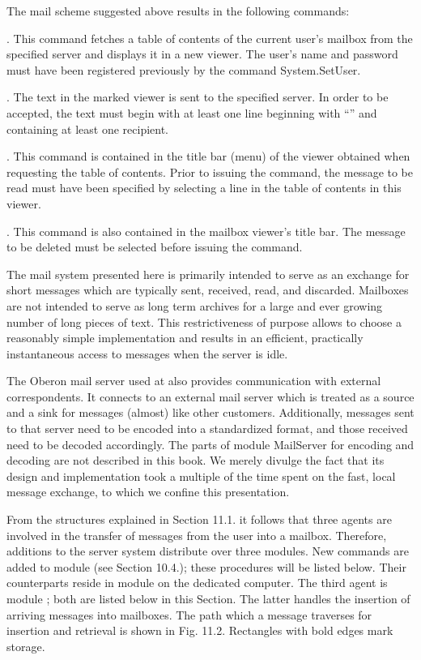 The mail scheme suggested above results in the following commands:

. This command fetches a table of contents of the current user's mailbox from the specified server and displays it in a new viewer. The user's name and password must have been registered previously by the command System.SetUser.

. The text in the marked viewer is sent to the specified server. In order to be accepted, the text must begin with at least one line beginning with ``'' and containing at least one recipient.

. This command is contained in the title bar (menu) of the viewer obtained when requesting the table of contents. Prior to issuing the command, the message to be read must have been specified by selecting a line in the table of contents in this viewer.

. This command is also contained in the mailbox viewer's title bar. The message to be deleted must be selected before issuing the command.

The mail system presented here is primarily intended to serve as an exchange for short messages which are typically sent, received, read, and discarded. Mailboxes are not intended to serve as long term archives for a large and ever growing number of long pieces of text. This restrictiveness of purpose allows to choose a reasonably simple implementation and results in an efficient, practically instantaneous access to messages when the server is idle.

The Oberon mail server used at  also provides communication with external correspondents. It connects to an external mail server which is treated as a source and a sink for messages (almost) like other customers. Additionally, messages sent to that server need to be encoded into a standardized format, and those received need to be decoded accordingly. The parts of module MailServer for encoding and decoding are not described in this book. We merely divulge the fact that its design and implementation took a multiple of the time spent on the fast, local message exchange, to which we confine this presentation.

From the structures explained in Section 11.1. it follows that three agents are involved in the transfer of messages from the user into a mailbox. Therefore, additions to the server system distribute over three modules. New commands are added to module  (see Section 10.4.); these procedures will be listed below. Their counterparts reside in module  on the dedicated computer. The third agent is module ; both are listed below in this Section. The latter handles the insertion of arriving messages into mailboxes. The path which a message traverses for insertion and retrieval is shown in Fig. 11.2. Rectangles with bold edges mark storage.

